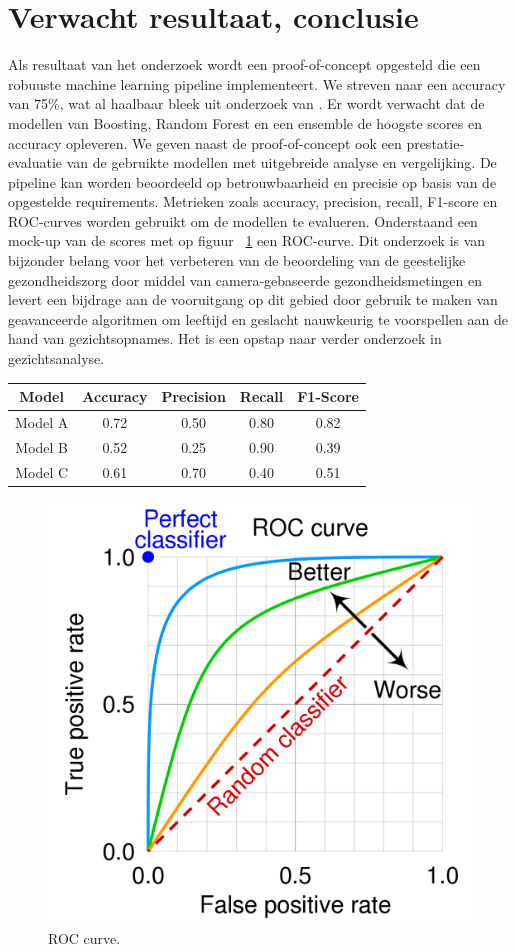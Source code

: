 \section{Verwacht resultaat, conclusie}%
\label{sec:verwachte_resultaten}

Als resultaat van het onderzoek wordt een proof-of-concept opgesteld die een robuuste machine learning pipeline implementeert. We streven naar een accuracy van 75\%, wat al haalbaar bleek uit onderzoek van \textcite{Sanil2023}. Er wordt verwacht dat de modellen van Boosting, Random Forest en een ensemble de hoogste scores en accuracy opleveren. We geven naast de proof-of-concept ook een prestatie-evaluatie van de gebruikte modellen met uitgebreide analyse en vergelijking. De pipeline kan worden beoordeeld op betrouwbaarheid en precisie op basis van de opgestelde requirements. Metrieken zoals accuracy, precision, recall, F1-score en ROC-curves worden gebruikt om de modellen te evalueren. Onderstaand een mock-up van de scores met op figuur {~\ref{fig:ROC}} een ROC-curve. Dit onderzoek is van bijzonder belang voor het verbeteren van de beoordeling van de geestelijke gezondheidszorg door middel van camera-gebaseerde gezondheidsmetingen en levert een bijdrage aan de vooruitgang op dit gebied door gebruik te maken van geavanceerde algoritmen om leeftijd en geslacht nauwkeurig te voorspellen aan de hand van gezichtsopnames. Het is een opstap naar verder onderzoek in gezichtsanalyse. 

\begin{center}
    \begin{tabular}{||c c c c c||} 
        \hline
        Model & Accuracy & Precision & Recall & F1-Score \\ 
        \hline
        Model A & 0.72 & 0.50 & 0.80 & 0.82 \\ 
        \hline
        Model B & 0.52 & 0.25 & 0.90 & 0.39 \\
        \hline
        Model C & 0.61 & 0.70 & 0.40 & 0.51 \\
    \end{tabular}
\end{center}

\begin{figure}
    \centering
    \includegraphics[width=\columnwidth]{graphics/ROCcurve.png}
    \caption{\label{fig:ROC}ROC curve\autocite{Gomede2023}.}
\end{figure}
